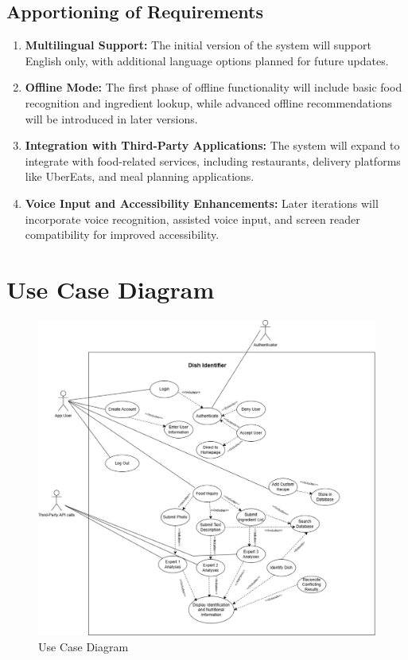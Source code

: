 \documentclass[]{article}
\begin{document}

\subsection{Apportioning of Requirements}
\label{sub:apportioning_of_requirements}
\begin{enumerate}
    \item \textbf{Multilingual Support:} The initial version of the system will support English only, with additional language options planned for future updates.
    \item \textbf{Offline Mode:} The first phase of offline functionality will include basic food recognition and ingredient lookup, while advanced offline recommendations will be introduced in later versions.
    \item \textbf{Integration with Third-Party Applications:} The system will expand to integrate with food-related services, including restaurants, delivery platforms like UberEats, and meal planning applications.
    \item \textbf{Voice Input and Accessibility Enhancements:} Later iterations will incorporate voice recognition, assisted voice input, and screen reader compatibility for improved accessibility.
\end{enumerate}

\section{Use Case Diagram}
\label{sec:use_case_diagram}

\begin{figure}[H]
    \centering
    \includegraphics[width=\textwidth]{image/3_use_case_diagram.pdf}
    \caption{Use Case Diagram}
\end{figure}
\end{document}
